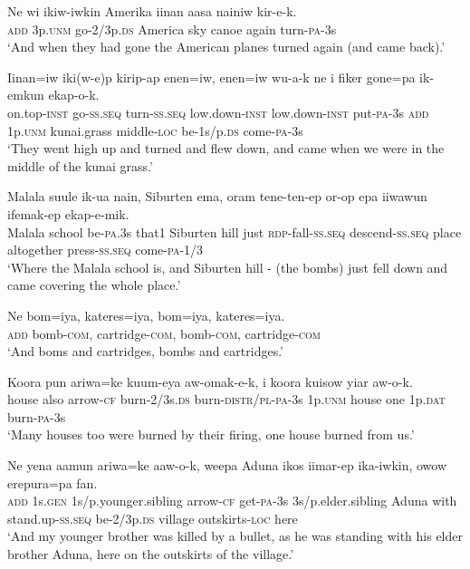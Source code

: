 \ea
\gll  Ne  wi  ikiw-iwkin  Amerika  iinan  aasa  nainiw  kir-e-k. \\
\textsc{add}  3p.\textsc{unm}  go-2/3p.\textsc{ds}  America  sky  canoe  again  turn-\textsc{pa}-3s \\
\glt ‘And when they had gone the American planes turned again (and came back).’ \\
\z


\ea
\gll  Iinan=iw  iki(w-e)p  kirip-ap  enen=iw, enen=iw  wu-a-k  ne  i  fiker  gone=pa  ik-emkun  ekap-o-k. \\
on.top-\textsc{inst}  go-\textsc{ss.seq}  turn-\textsc{ss.seq}  low.down-\textsc{inst}   low.down-\textsc{inst}  put-\textsc{pa}-3s  \textsc{add}  1p.\textsc{unm}  kunai.grass  middle-\textsc{loc} 
be-1s/p.\textsc{ds}  come-\textsc{pa}-3s \\
\glt ‘They went high up and turned and flew down, and came when we were in the middle of the kunai grass.’ \\
\z


\ea
\gll  Malala  suule  ik-ua  nain,  Siburten  ema,  oram  tene-ten-ep  or-op  epa  iiwawun  ifemak-ep  ekap-e-mik. \\
Malala  school  be-\textsc{pa}.3s  that1  Siburten  hill  just  \textsc{rdp}-fall-\textsc{ss.seq} descend-\textsc{ss.seq}  place  altogether  press-\textsc{ss.seq}  come-\textsc{pa}-1/3 \\
\glt ‘Where the Malala school is, and Siburten hill - (the bombs) just fell down and came covering the whole place.’ \\
\z


\ea
\gll  Ne  bom=iya,  kateres=iya,  bom=iya,  kateres=iya. \\
\textsc{add}  bomb-\textsc{com},  cartridge-\textsc{com},  bomb-\textsc{com},  cartridge-\textsc{com} \\
\glt ‘And boms and cartridges, bombs and cartridges.’ \\
\z


\ea
\gll  Koora  pun  ariwa=ke  kuum-eya  aw-omak-e-k,  i  koora  kuisow  yiar  aw-o-k. \\
house  also  arrow-\textsc{cf}  burn-2/3s.\textsc{ds}  burn-\textsc{distr}/\textsc{pl}-\textsc{pa}-3s 1p.\textsc{unm}  house  one  1p.\textsc{dat}  burn-\textsc{pa}-3s \\
\glt ‘Many houses too were burned by their firing, one house burned from us.’ \\
\z


\ea
\gll  Ne  yena  aamun  ariwa=ke  aaw-o-k, weepa  Aduna  ikos  iimar-ep  ika-iwkin,  owow  erepura=pa  fan. \\
\textsc{add}  1s.\textsc{gen}  1s/p.younger.sibling  arrow-\textsc{cf}  get-\textsc{pa}-3s 3s/p.elder.sibling  Aduna  with  stand.up-\textsc{ss.seq}  be-2/3p.\textsc{ds} village  outskirts-\textsc{loc}  here \\
\glt ‘And my younger brother was killed by a bullet, as he was standing with his elder brother Aduna, here on the outskirts of the village.’ \\
\z



